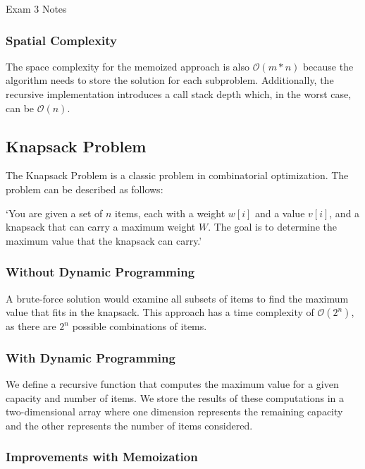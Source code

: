 \begin{examnotes}{Exam 3 Notes}
\begin{highlight}
        \subsubsection*{Spatial Complexity}

        The space complexity for the memoized approach is also $\mathcal{O}(m*n)$ because the algorithm needs to store the solution for each subproblem. Additionally, the recursive implementation 
        introduces a call stack depth which, in the worst case, can be $\mathcal{O}(n)$.
    \end{highlight}

    \subsection*{Knapsack Problem}

    The Knapsack Problem is a classic problem in combinatorial optimization. The problem can be described as follows:

    `You are given a set of $n$ items, each with a weight $w[i]$ and a value $v[i]$, and a knapsack that can carry a maximum weight $W$. The goal is to determine the maximum value that the knapsack can carry.'

    \subsubsection*{Without Dynamic Programming}

    A brute-force solution would examine all subsets of items to find the maximum value that fits in the knapsack. This approach has a time complexity of $\mathcal{O}(2^n)$, as there are $2^n$ possible 
    combinations of items.

    \subsubsection*{With Dynamic Programming}

    We define a recursive function that computes the maximum value for a given capacity and number of items. We store the results of these computations in a two-dimensional array where one dimension 
    represents the remaining capacity and the other represents the number of items considered.

    \begin{highlight}
        \subsubsection*{Improvements with Memoization}


\end{highlight}
\end{examnotes}
